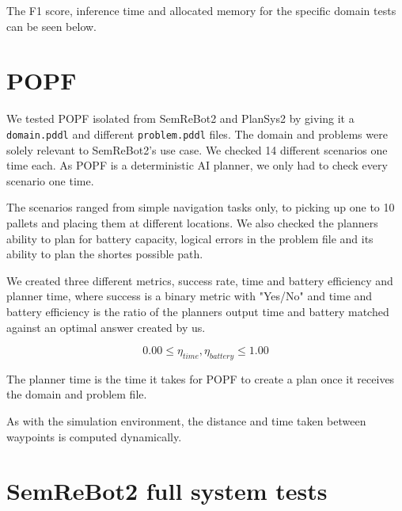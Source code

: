The F1 score, inference time and allocated memory for the specific domain tests can be seen below.



\section{POPF}\label{sec:POPF_experiments}
We tested POPF isolated from SemReBot2 and PlanSys2 by giving it a \verb|domain.pddl| and different
\verb|problem.pddl| files. The domain and problems were solely relevant to SemReBot2's use case. We
checked 14 different scenarios one time each. As POPF is a deterministic AI planner, we only had to
check every scenario one time.

The scenarios ranged from simple navigation tasks only, to picking up one to 10 pallets and placing
them at different locations. We also checked the planners ability to plan for battery capacity,
logical errors in the problem file and its ability to plan the shortes possible path.

We created three different metrics, success rate, time and battery efficiency and planner time, where success
is a binary metric with "Yes/No" and time and battery efficiency is the ratio of the planners output
time and battery matched against an optimal answer created by us.

\begin{equation}\label{eq:popf_efficiency_metrics}
    0.00 \leq \eta_{time}, \eta_{battery} \leq 1.00
\end{equation}

The planner time is the time it takes for POPF to create a plan once it receives the domain and problem
file.

As with the simulation environment, the distance and time taken between waypoints is computed dynamically.


\section{SemReBot2 full system tests}\label{sec:SemReBot2_experiments}